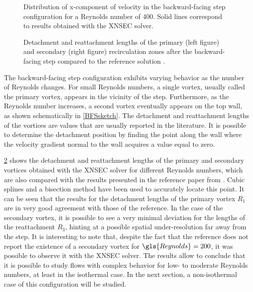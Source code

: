 \begin{figure}[bt]
	\centering
	\caption[Distribution of x-component of velocity in the backward-facing step configuration for a Reynolds number of 400.]{Distribution of x-component of velocity in the backward-facing step configuration for a Reynolds number of 400. Solid lines correspond to results obtained with the XNSEC solver.}
	\label{fig:uvelBFS}
\end{figure}



\begin{figure}[tb]
	\centering
	\caption[Detachment and reattachment lengths of the primary and secondary recirculation zones after the backward-facing step compared to the reference solution]{ Detachment and reattachment lengths of the primary (left figure) and secondary (right figure) recirculation zones after the backward-facing step compared to the reference solution \parencite{biswasBackwardFacingStepFlows2004}.}
	\label{fig:Re_De_Attachmentlengths}
\end{figure}
The backward-facing step configuration exhibits varying behavior as the number of Reynolds changes. For small Reynolds numbers, a single vortex, usually called the primary vortex, appears in the vicinity of the step. Furthermore, as the Reynolds number increases, a second vortex eventually appears on the top wall, as shown schematically in \cref{BFSsketch}.
The detachment and reattachment lengths of the vortices are values that are usually reported in the literature. It is possible to determine the detachment position by finding the point along the wall where the velocity gradient normal to the wall acquires a value equal to zero. 

\cref{fig:Re_De_Attachmentlengths} shows the detachment and reattachment lengths of the primary and secondary vortices obtained with the XNSEC solver for different Reynolds numbers, which are also compared with the results presented in the reference paper from \textcite{biswasBackwardFacingStepFlows2004}. Cubic splines and a bisection method have been used to accurately locate this point. It can be seen that the results for the detachment lengths of the primary vortex $R_1$ are in very good agreement with those of the reference. In the case of the secondary vortex, it is possible to see a very minimal deviation for the lengths of the reattachment $R_3$, hinting at a possible spatial under-resolution far away from the step. It is interesting to note that, despite the fact that the reference does not report the existence of a secondary vortex for $\gls{Reynolds} = 200$, it was possible to observe it with the XNSEC solver. The results allow to conclude that it is possible to study flows with complex behavior for low- to moderate Reynolds numbers, at least in the isothermal case. In the next section, a non-isothermal case of this configuration will be studied.

